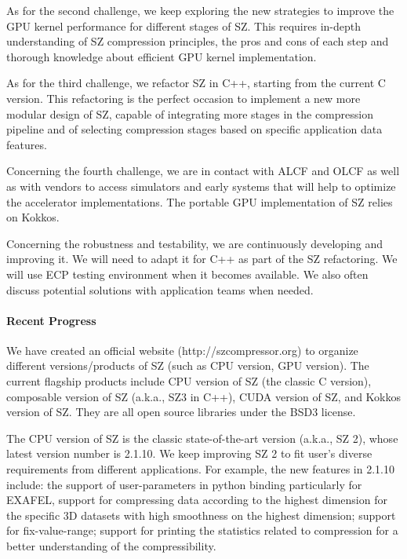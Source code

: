 As for the second challenge, we keep exploring the new strategies to improve the GPU kernel performance for different stages of SZ. This requires in-depth understanding of SZ compression principles, the pros and cons of each step and thorough knowledge about efficient GPU kernel implementation.  

As for the third challenge, we refactor SZ in C++, starting from the current C version. This refactoring is the perfect occasion to implement a new more modular design of SZ, capable of integrating more stages in the compression pipeline and of selecting compression stages based on specific application data features.

Concerning the fourth challenge, we are in contact with ALCF and OLCF as well as with vendors to access simulators and early systems that will help to optimize the accelerator implementations. The portable GPU implementation of SZ relies on Kokkos.

Concerning the robustness and testability, we are continuously developing and improving it. We will need to adapt it for C++ as part of the SZ refactoring. We will use ECP testing environment when it becomes available. We also often discuss potential solutions with application teams when needed. 


\paragraph{Recent Progress}

We have created an official website (http://szcompressor.org) to organize different versions/products of SZ (such as CPU version, GPU version). The current flagship products include CPU version of SZ (the classic C version), composable version of SZ (a.k.a., SZ3 in C++), CUDA version of SZ, and Kokkos version of SZ. They are all open source libraries under the BSD3 license.

The CPU version of SZ is the classic state-of-the-art version (a.k.a., SZ 2), whose latest version number is 2.1.10. We keep improving SZ 2 to fit user's diverse requirements from different applications. For example, the new features in 2.1.10 include:  the support of user-parameters in python binding particularly for EXAFEL, support for compressing data according to the highest dimension for the specific 3D datasets with high smoothness on the highest dimension; support for fix-value-range; support for printing the statistics related to compression for a better understanding of the compressibility. %

